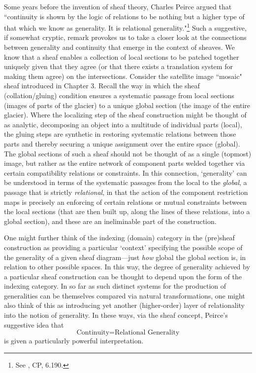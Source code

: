 \documentclass[a4paper]{book}
\theoremstyle{definition}
\theoremstyle{definition}
\theoremstyle{definition}
\theoremstyle{theorem}
\theoremstyle{definition}
\begin{document}
Some years before the invention of sheaf theory, Charles Peirce argued that ``continuity is shown by the logic of relations to be nothing but a higher type of that which we know as generality. It is relational generality."\footnote{See \cite{peirce_collected_1997}, CP, 6.190.} Such a suggestive, if somewhat cryptic, remark provokes us to take a closer look at the connections between generality and continuity that emerge in the context of sheaves. We know that a sheaf enables a collection of local sections to be patched together uniquely given that they agree (or that there exists a translation system for making them agree) on the intersections. Consider the satellite image ``mosaic" sheaf introduced in Chapter 3. Recall the way in which the sheaf (collation/gluing) condition ensures a systematic passage from local sections (images of parts of the glacier) to a unique global section (the image of the entire glacier). Where the localizing step of the sheaf construction might be thought of as analytic, decomposing an object into a multitude of individual parts (local), the gluing steps are synthetic in restoring systematic relations between those parts and thereby securing a unique assignment over the entire space (global). The global sections of such a sheaf should not be thought of as a single (topmost) image, but rather as the entire network of component parts welded together via certain compatibility relations or constraints. In this connection, `generality' can be understood in terms of the systematic passages from the local to the \textit{global}, a passage that is strictly \textit{relational}, in that the action of the component restriction maps is precisely an enforcing of certain relations or mutual constraints between the local sections (that are then built up, along the lines of these relations, into a global section), and these are an ineliminable part of the construction. \par 
One might further think of the indexing (domain) category in the (pre)sheaf construction as providing a particular `context' specifying the possible scope of the generality of a given sheaf diagram---just \textit{how} global the global section is, in relation to other possible spaces. In this way, the degree of generality achieved by a particular sheaf construction can be thought to depend upon the form of the indexing category. In so far as such distinct systems for the production of generalities can be themselves compared via natural transformations, one might also think of this as introducing yet another (higher-order) layer of relationality into the notion of generality. In these ways, via the sheaf concept, Peirce's suggestive idea that 
\begin{equation*}
\text{Continuity} = \text{Relational Generality}
\end{equation*}  
is given a particularly powerful interpretation. 
\end{document}
